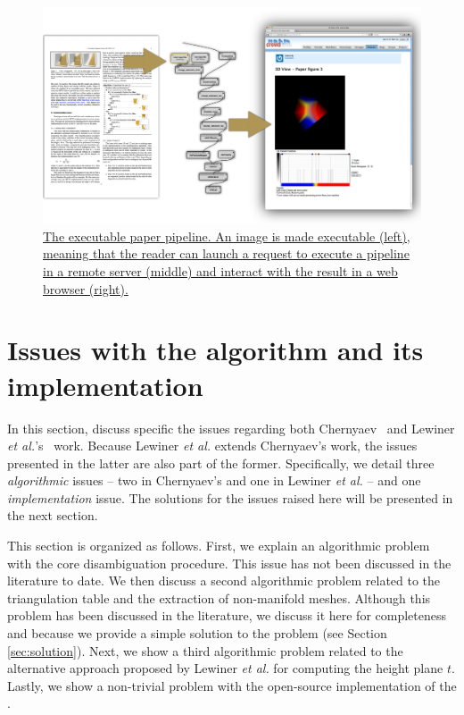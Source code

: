 \begin{figure}[t]
     \centering
    \includegraphics[width=0.5\linewidth]{chapter4/figures/executable.png}
     \caption{ \label{fig:executable}\href{http://dl.dropbox.com/u/8414964/C-MC33/webpage/index.html}{The executable paper pipeline. An image is made executable (left), meaning that the reader can launch a request to execute a pipeline in a remote server (middle) and interact with the result in a web browser (right).}}
     
\end{figure}

\section{Issues with the \mc{} algorithm and its implementation}
\label{erros_cause:chernyaev}

In this section, discuss specific the issues regarding both Chernyaev~\cite{Chernyaev95marchingcubes} and Lewiner \emph{et al.}'s~\cite{Lewiner:2003} work. Because Lewiner \emph{et al.} extends Chernyaev's work, the issues presented in the latter are also part of the former. Specifically, we detail three \emph{algorithmic} issues -- two in Chernyaev's \mc{} and one in Lewiner \emph{et al.}  --  and one \emph{implementation} issue. The solutions for the issues raised here will be presented in the next section.

This section is organized as follows. First, we explain an algorithmic problem with the \mc{} core disambiguation procedure. This issue has not been discussed in the literature to date. We then discuss a second algorithmic problem related to the triangulation table and the extraction of non-manifold meshes. Although this problem has been discussed in the literature, we discuss it here for completeness and because we provide a simple solution to the problem (see Section \ref{sec:solution}). Next, we show a third algorithmic problem related to the alternative approach proposed by Lewiner \emph{et al.} for computing the height plane $t$. Lastly, we show a non-trivial problem with the open-source implementation of the \mc{}. 

